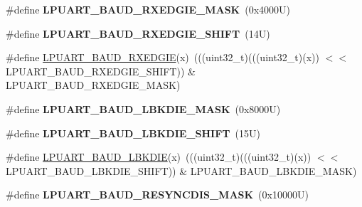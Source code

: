 \begin{DoxyCompactItemize}
\item 
\mbox{\label{group___l_p_u_a_r_t___register___masks_ga6102ea87786499722af536351cb0ae0e}} 
\#define {\bfseries L\+P\+U\+A\+R\+T\+\_\+\+B\+A\+U\+D\+\_\+\+R\+X\+E\+D\+G\+I\+E\+\_\+\+M\+A\+SK}~(0x4000\+U)
\item 
\mbox{\label{group___l_p_u_a_r_t___register___masks_ga685125187e80c136d77d1069057f06a4}} 
\#define {\bfseries L\+P\+U\+A\+R\+T\+\_\+\+B\+A\+U\+D\+\_\+\+R\+X\+E\+D\+G\+I\+E\+\_\+\+S\+H\+I\+FT}~(14\+U)
\item 
\#define \mbox{\hyperlink{group___l_p_u_a_r_t___register___masks_gaeb0bcf6a6082b068b0268e0eb5428123}{L\+P\+U\+A\+R\+T\+\_\+\+B\+A\+U\+D\+\_\+\+R\+X\+E\+D\+G\+IE}}(x)~(((uint32\+\_\+t)(((uint32\+\_\+t)(x)) $<$$<$ L\+P\+U\+A\+R\+T\+\_\+\+B\+A\+U\+D\+\_\+\+R\+X\+E\+D\+G\+I\+E\+\_\+\+S\+H\+I\+FT)) \& L\+P\+U\+A\+R\+T\+\_\+\+B\+A\+U\+D\+\_\+\+R\+X\+E\+D\+G\+I\+E\+\_\+\+M\+A\+SK)
\item 
\mbox{\label{group___l_p_u_a_r_t___register___masks_gaa99df5ebffee879a29dd54bb9589ea39}} 
\#define {\bfseries L\+P\+U\+A\+R\+T\+\_\+\+B\+A\+U\+D\+\_\+\+L\+B\+K\+D\+I\+E\+\_\+\+M\+A\+SK}~(0x8000\+U)
\item 
\mbox{\label{group___l_p_u_a_r_t___register___masks_gad8af1d56b921eb311d3bc010ac371e37}} 
\#define {\bfseries L\+P\+U\+A\+R\+T\+\_\+\+B\+A\+U\+D\+\_\+\+L\+B\+K\+D\+I\+E\+\_\+\+S\+H\+I\+FT}~(15\+U)
\item 
\#define \mbox{\hyperlink{group___l_p_u_a_r_t___register___masks_gaf701684966ed3fbd665ecc21ebe5931c}{L\+P\+U\+A\+R\+T\+\_\+\+B\+A\+U\+D\+\_\+\+L\+B\+K\+D\+IE}}(x)~(((uint32\+\_\+t)(((uint32\+\_\+t)(x)) $<$$<$ L\+P\+U\+A\+R\+T\+\_\+\+B\+A\+U\+D\+\_\+\+L\+B\+K\+D\+I\+E\+\_\+\+S\+H\+I\+FT)) \& L\+P\+U\+A\+R\+T\+\_\+\+B\+A\+U\+D\+\_\+\+L\+B\+K\+D\+I\+E\+\_\+\+M\+A\+SK)
\item 
\mbox{\label{group___l_p_u_a_r_t___register___masks_ga6cc09978510e9e2d5f956363bbdf82a0}} 
\#define {\bfseries L\+P\+U\+A\+R\+T\+\_\+\+B\+A\+U\+D\+\_\+\+R\+E\+S\+Y\+N\+C\+D\+I\+S\+\_\+\+M\+A\+SK}~(0x10000\+U)
\item 
\mbox{\label{group___l_p_u_a_r_t___register___masks_ga7e405b396cace095b81ed780012d86c7}} 

\end{DoxyCompactItemize}
